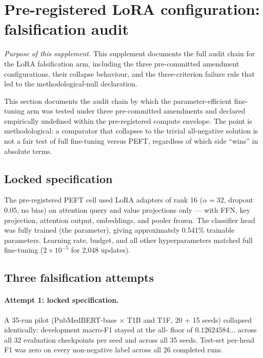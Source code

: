 \section{Pre-registered LoRA configuration: falsification audit}
\label{supp:lora-audit}

\textit{Purpose of this supplement.}\;
This supplement documents the full audit chain for the LoRA
falsification arm, including the three pre-committed amendment
configurations, their collapse behaviour, and the three-criterion
failure rule that led to the methodological-null declaration.

This section documents the audit chain by which the parameter-efficient
fine-tuning arm was tested under three pre-committed amendments and
declared empirically undefined within the pre-registered compute
envelope. The point is methodological: a comparator that collapses to
the trivial all-negative solution is not a fair test of full
fine-tuning versus PEFT, regardless of which side ``wins'' in absolute
terms.

\subsection{Locked specification}

The pre-registered PEFT cell used LoRA \citep{hu2022lora} adapters
of rank 16 ($\alpha = 32$, dropout 0.05, no bias) on attention query
and value projections only --- with FFN, key projection, attention
output, embeddings, and pooler frozen. The classifier head was fully
trained (the  parameter), giving approximately
0.541\% trainable parameters. Learning rate, budget, and all other
hyperparameters matched full fine-tuning ($2\times 10^{-5}$ for
2{,}048 updates).

\subsection{Three falsification attempts}

\paragraph{Attempt 1: locked specification.}
A 35-run pilot (PubMedBERT-base $\times$ T1B and T1F, 20 + 15 seeds)
collapsed identically: development macro-F1 stayed at the
all- floor of $0.12624584\ldots$ across all 32
evaluation checkpoints per seed and across all 35 seeds. Test-set
per-head F1 was zero on every non-negative label across all 26
completed runs.

